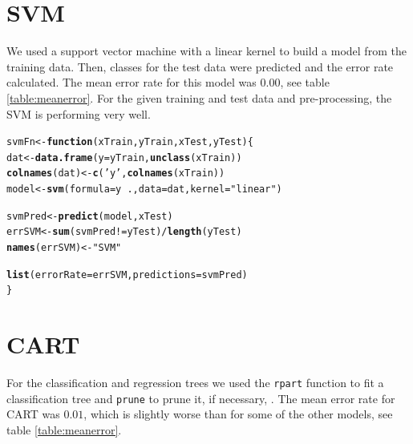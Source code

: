 \documentclass[a4paper,draft=false]{scrreprt}\usepackage[]{graphicx}\usepackage[]{color}
\makeatletter
\newcommand{\hlstr}[1]{\textcolor[rgb]{0.192,0.494,0.8}{#1}}%
\newcommand{\hlopt}[1]{\textcolor[rgb]{0,0,0}{#1}}%
\newcommand{\hlstd}[1]{\textcolor[rgb]{0.345,0.345,0.345}{#1}}%
\newcommand{\hlkwa}[1]{\textcolor[rgb]{0.161,0.373,0.58}{\textbf{#1}}}%
\newcommand{\hlkwb}[1]{\textcolor[rgb]{0.69,0.353,0.396}{#1}}%
\newcommand{\hlkwc}[1]{\textcolor[rgb]{0.333,0.667,0.333}{#1}}%
\newcommand{\hlkwd}[1]{\textcolor[rgb]{0.737,0.353,0.396}{\textbf{#1}}}%
\newenvironment{kframe}{%
 \def\at@end@of@kframe{}%
 \ifinner\ifhmode%
  \def\at@end@of@kframe{\end{minipage}}%
  \begin{minipage}{\columnwidth}%
 \fi\fi%
 \def\FrameCommand##1{\hskip\@totalleftmargin \hskip-\fboxsep
 \colorbox{shadecolor}{##1}\hskip-\fboxsep
     \hskip-\linewidth \hskip-\@totalleftmargin \hskip\columnwidth}%
 \MakeFramed {\advance\hsize-\width
   \@totalleftmargin\z@ \linewidth\hsize
   \@setminipage}}%
 {\par\unskip\endMakeFramed%
 \at@end@of@kframe}
\newenvironment{knitrout}{}{} %
\makeatother
\begin{document}
\section{SVM} %
We used a support vector machine \cite{e1071} with a linear kernel to build a model from the training data. Then, classes for the test data were predicted and the error rate calculated. The mean error rate for this model was $0.00$, see table \ref{table:meanerror}. For the given training and test data and pre-processing, the SVM is performing very well.
\begin{knitrout}
\color{fgcolor}\begin{kframe}
\begin{alltt}
\hlstd{svmFn} \hlkwb{<-} \hlkwa{function}\hlstd{(}\hlkwc{xTrain}\hlstd{,} \hlkwc{yTrain}\hlstd{,} \hlkwc{xTest}\hlstd{,} \hlkwc{yTest}\hlstd{)\{}
    \hlstd{dat} \hlkwb{<-} \hlkwd{data.frame}\hlstd{(}\hlkwc{y} \hlstd{= yTrain,} \hlkwd{unclass}\hlstd{(xTrain))}
    \hlkwd{colnames}\hlstd{(dat)} \hlkwb{<-} \hlkwd{c}\hlstd{(}\hlstr{'y'}\hlstd{,} \hlkwd{colnames}\hlstd{(xTrain))}
    \hlstd{model} \hlkwb{<-} \hlkwd{svm}\hlstd{(}\hlkwc{formula} \hlstd{= y} \hlopt{~} \hlstd{.,} \hlkwc{data} \hlstd{= dat,} \hlkwc{kernel} \hlstd{=} \hlstr{"linear"}\hlstd{)}

    \hlstd{svmPred} \hlkwb{<-} \hlkwd{predict}\hlstd{(model, xTest)}
    \hlstd{errSVM} \hlkwb{<-} \hlkwd{sum}\hlstd{(svmPred} \hlopt{!=} \hlstd{yTest)} \hlopt{/} \hlkwd{length}\hlstd{(yTest)}
    \hlkwd{names}\hlstd{(errSVM)} \hlkwb{<-} \hlstr{"SVM"}

    \hlkwd{list}\hlstd{(}\hlkwc{errorRate} \hlstd{= errSVM,} \hlkwc{predictions} \hlstd{= svmPred)}
\hlstd{\}}
\end{alltt}
\end{kframe}
\end{knitrout}

\section{CART} %
For the classification and regression trees we used the \verb+rpart+ function to fit a classification tree and \verb+prune+ to prune it, if necessary, \cite{rpart}. The mean error rate for CART was $0.01$, which is slightly worse than for some of the other models, see table \ref{table:meanerror}.
\end{document}
